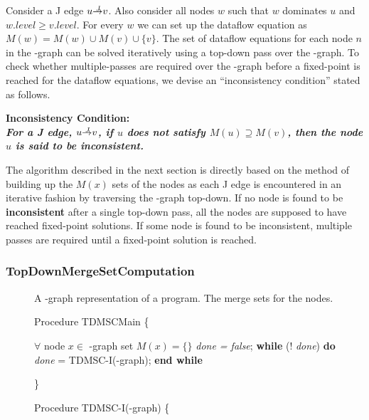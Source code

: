{Consider a J edge $u \st{J} v$. Also consider all nodes $w$ such that $w$ dominates $u$ and $w.level \geq v.level$. For every $w$ we can set up the dataflow equation as $M(w) = M(w) \cup M(v) \cup \{v\}$. The set of dataflow equations for each node $n$ in the \DJ-graph can be solved iteratively using a top-down pass over the \DJ-graph. To check whether multiple-passes are required over the \DJ-graph before a fixed-point is reached for the dataflow equations, we devise an ``inconsistency condition'' stated as follows.

\begin{center}
\bf{Inconsistency Condition:}\\
\it{For a J edge, $u \st{J} v$, if $u$ does not satisfy
$M(u)\supseteq M(v)$, then the node $u$ is said to be inconsistent}. 
\end{center}

The algorithm described in the next section is directly based on the method of building
up the $M(x)$ sets of the nodes as each J edge is encountered in an iterative fashion by
traversing the \DJ-graph top-down. If no node is found to be {\bf inconsistent} after a single 
top-down pass, all the nodes are supposed to have reached fixed-point solutions. If some node
is found to be inconsistent, multiple passes are required until a fixed-point solution is reached.


\subsubsection{TopDownMergeSetComputation}

\begin{figure}[!ht]
\centering
\begin{minipage}[t]{5in}
 A \DJ-graph representation of a program.
 The merge sets for the nodes.

\setcounter{linectr}{0}
Procedure TDMSCMain
\{
\begin{code}
 $\forall$ node $x \in$ \DJ-graph set $M(x) = \{\}$
 {\it done = false};
 {\bf while} (! {\it done}) {\bf do}
     {\it done} = TDMSC-I(\DJ-graph);
 {\bf end while}
\end{code}
\}

Procedure TDMSC-I(\DJ-graph)
\{
\begin{code}


\end{code}
\end{minipage}
\end{figure}}
